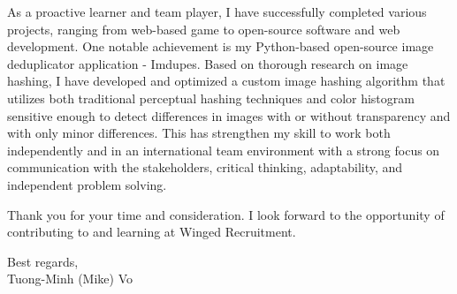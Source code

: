\documentclass[a4paper,11pt]{article}
\newcommand{\p}[1]{#1\\\vspace{6pt}}
\begin{document}
\p{As a proactive learner and team player, I have successfully completed various projects, ranging from web-based game to open-source software and web development. One notable achievement is my Python-based open-source image deduplicator application - Imdupes. Based on thorough research on image hashing, I have developed and optimized a custom image hashing algorithm that utilizes both traditional perceptual hashing techniques and color histogram sensitive enough to detect differences in images with or without transparency and with only minor differences. This has strengthen my skill to work both independently and in an international team environment with a strong focus on communication with the stakeholders, critical thinking, adaptability, and independent problem solving.}

\p{Thank you for your time and consideration. I look forward to the opportunity of contributing to and learning at Winged Recruitment.}

\p{Best regards,\\
Tuong-Minh (Mike) Vo}
%
\end{document}
